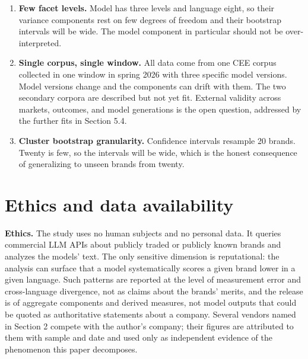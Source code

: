 \documentclass[pdflatex,sn-mathphys-num]{sn-jnl}
\begin{document}
\begin{enumerate}
\item
  \textbf{Few facet levels.} Model has three levels and language eight, so their variance components rest on few degrees of freedom and their bootstrap intervals will be wide. The model component in particular should not be over-interpreted.
\item
  \textbf{Single corpus, single window.} All data come from one CEE corpus collected in one window in spring 2026 with three specific model versions. Model versions change and the components can drift with them. The two secondary corpora are described but not yet fit. External validity across markets, outcomes, and model generations is the open question, addressed by the further fits in Section 5.4.
\item
  \textbf{Cluster bootstrap granularity.} Confidence intervals resample 20 brands. Twenty is few, so the intervals will be wide, which is the honest consequence of generalizing to unseen brands from twenty.
\end{enumerate}

\section{Ethics and data availability}\label{ethics-and-data-availability}

\textbf{Ethics.} The study uses no human subjects and no personal data. It queries commercial LLM APIs about publicly traded or publicly known brands and analyzes the models' text. The only sensitive dimension is reputational: the analysis can surface that a model systematically scores a given brand lower in a given language. Such patterns are reported at the level of measurement error and cross-language divergence, not as claims about the brands' merits, and the release is of aggregate components and derived measures, not model outputs that could be quoted as authoritative statements about a company. Several vendors named in Section 2 compete with the author's company; their figures are attributed to them with sample and date and used only as independent evidence of the phenomenon this paper decomposes.
\end{document}
